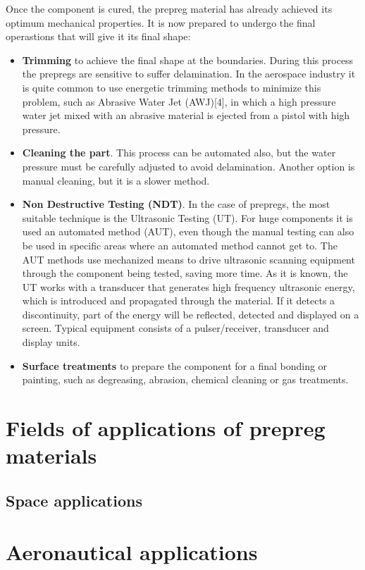 Once the component is cured, the prepreg material has already achieved its optimum mechanical properties. It is now prepared to undergo the final operastions that will give it its final shape:

\begin{itemize}
\item \textbf{Trimming} to achieve the final shape at the boundaries. During this process the prepregs are sensitive to suffer delamination. In the aerospace industry it is quite common to use energetic trimming methods to minimize this problem, such as Abrasive Water Jet (AWJ)[4], in which a high pressure water jet mixed with an abrasive material is ejected from a pistol with high pressure.
\item \textbf{Cleaning the part}. This process can be automated also, but the water pressure must be carefully adjusted to avoid delamination. Another option is manual cleaning, but it is a slower method.
\item \textbf{Non Destructive Testing (NDT)}. In the case of prepregs, the most suitable technique is the Ultrasonic Testing (UT). For huge components it is used an automated method (AUT), even though the manual testing can also be used in specific areas where an automated method cannot get to. The AUT methods use mechanized means to drive ultrasonic scanning equipment through the component being tested, saving more time. As it is known, the UT works with a transducer that generates high frequency ultrasonic energy, which is introduced and propagated through the material. If it detects a discontinuity, part of the energy will be reflected, detected and displayed on a screen. Typical equipment consists of a pulser/receiver, transducer and display units.
\item \textbf{Surface treatments} to prepare the component for a final bonding or painting, such as degreasing, abrasion, chemical cleaning or gas treatments.
\end{itemize}


\section{Fields of applications of prepreg materials}

\subsection{Space applications}

\section{Aeronautical applications}

